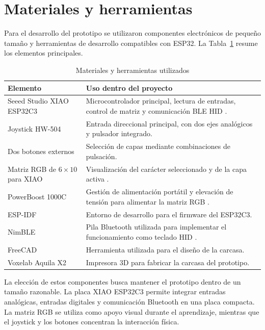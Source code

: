 \section{Materiales y herramientas}
\label{sec:materiales-herramientas}

Para el desarrollo del prototipo se utilizaron componentes electrónicos de pequeño tamaño y herramientas de desarrollo compatibles con ESP32. La Tabla~\ref{tab:materiales-herramientas} resume los elementos principales.

\begin{table}[H]
    \centering
    \caption{Materiales y herramientas utilizados}
    \label{tab:materiales-herramientas}
    \begin{tabularx}{\textwidth}{@{}p{}X@{}}
        \toprule
        \textbf{Elemento} & \textbf{Uso dentro del proyecto} \\
        \midrule
        Seeed Studio XIAO ESP32C3 & Microcontrolador principal, lectura de entradas, control de matriz y comunicación BLE HID \cite{xiaoESP32C3}. \\
        Joystick HW-504 & Entrada direccional principal, con dos ejes analógicos y pulsador integrado. \\
        Dos botones externos & Selección de capas mediante combinaciones de pulsación. \\
        Matriz RGB de \(6 \times 10\) para XIAO & Visualización del carácter seleccionado y de la capa activa \cite{seeedRGBMatrix}. \\
        PowerBoost 1000C & Gestión de alimentación portátil y elevación de tensión para alimentar la matriz RGB \cite{adafruitPowerBoost1000C}. \\
        ESP-IDF & Entorno de desarrollo para el firmware del ESP32C3. \\
        NimBLE & Pila Bluetooth utilizada para implementar el funcionamiento como teclado HID \cite{espressifNimBLE}. \\
        FreeCAD & Herramienta utilizada para el diseño de la carcasa. \\
        Voxelab Aquila X2 & Impresora 3D para fabricar la carcasa del prototipo. \\
        \bottomrule
    \end{tabularx}
\end{table}

La elección de estos componentes busca mantener el prototipo dentro de un tamaño razonable. La placa XIAO ESP32C3 permite integrar entradas analógicas, entradas digitales y comunicación Bluetooth en una placa compacta. La matriz RGB se utiliza como apoyo visual durante el aprendizaje, mientras que el joystick y los botones concentran la interacción física.

